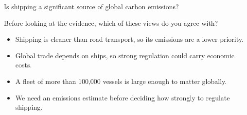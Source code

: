 \documentclass[aspectratio=169,11pt]{beamer}
\begin{document}

\begin{frame}{Is shipping a significant source of global carbon emissions?}
  \vspace{0.14cm}
  {\color{Ink}\fontsize{11.8}{15.5}\selectfont
    Before looking at the evidence, which of these views do you agree with?
    \vspace{0.18cm}
    \begin{itemize}
      \setlength{\itemsep}{0.2cm}
      \item Shipping is cleaner than road transport, so its emissions are a
        lower priority.
      \item Global trade depends on ships, so strong regulation could carry
        economic costs.
      \item A fleet of more than 100,000 vessels is large enough to matter
        globally.
      \item We need an emissions estimate before deciding how strongly to
        regulate shipping.
    \end{itemize}
  }

\end{frame}
\end{document}
